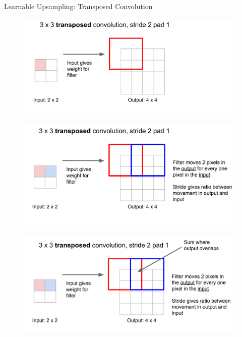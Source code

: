\documentclass[10pt]{beamer}
\theoremstyle{remark}
\theoremstyle{definition}
\begin{document}
\begin{frame}[allowframebreaks]{Learnable Upsampling: Transposed Convolution}
\framebreak

\begin{figure}
\centering
\includegraphics[width=1.0\textwidth,height=1.0\textheight,keepaspectratio]{./images/upsample_6.png}
\end{figure}

\framebreak

\begin{figure}
\centering
\includegraphics[width=1.0\textwidth,height=1.0\textheight,keepaspectratio]{./images/upsample_7.png}
\end{figure}

\framebreak

\begin{figure}
\centering
\includegraphics[width=1.0\textwidth,height=1.0\textheight,keepaspectratio]{./images/upsample_8.png}
\end{figure}


\end{frame}
\end{document}
